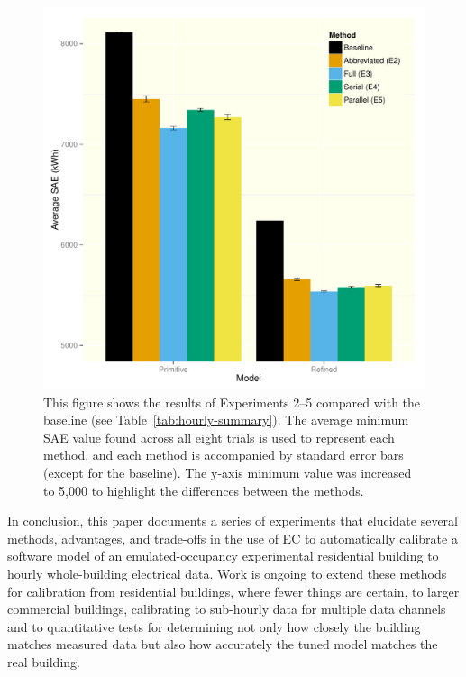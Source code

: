 \documentclass[preprint, review, 12pt]{elsarticle}
\begin{document}
\begin{figure}[htbp]
\centering
\includegraphics[width=5in]{graphics/figure3.pdf}
\caption{This figure shows the results of Experiments 2--5 compared with the baseline (see Table~\ref{tab:hourly-summary}). The average minimum SAE value found across all eight trials is used to represent each method, and each method is accompanied by standard error bars (except for the baseline). The y-axis minimum value was increased to 5,000 to highlight the differences between the methods.}
\label{fig:hourly-summary}
\end{figure}

In conclusion, this paper documents a series of experiments that elucidate several methods, advantages, and trade-offs in the use of EC to automatically calibrate a software model of an emulated-occupancy experimental residential building to hourly whole-building electrical data. Work is ongoing to extend these methods for calibration from %
residential buildings, where fewer things are certain, to larger commercial buildings, calibrating to sub-hourly data for multiple data channels and to quantitative tests for determining not only how closely the building matches measured data but also how accurately the tuned model matches the real building.
\end{document}
